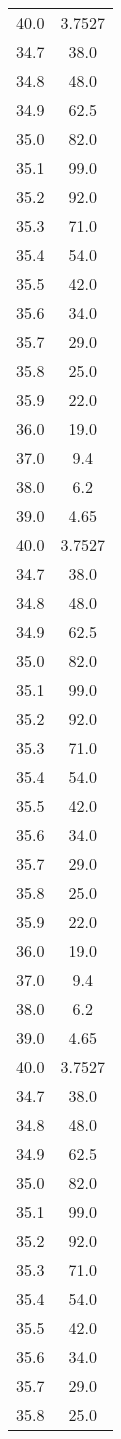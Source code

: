 \begin{table}
\begin{tabular}{S[]S[]}
40.0 & 3.7527\\
34.7 & 38.0\\
34.8 & 48.0\\
34.9 & 62.5\\
35.0 & 82.0\\
35.1 & 99.0\\
35.2 & 92.0\\
35.3 & 71.0\\
35.4 & 54.0\\
35.5 & 42.0\\
35.6 & 34.0\\
35.7 & 29.0\\
35.8 & 25.0\\
35.9 & 22.0\\
36.0 & 19.0\\
37.0 & 9.4\\
38.0 & 6.2\\
39.0 & 4.65\\
40.0 & 3.7527\\
34.7 & 38.0\\
34.8 & 48.0\\
34.9 & 62.5\\
35.0 & 82.0\\
35.1 & 99.0\\
35.2 & 92.0\\
35.3 & 71.0\\
35.4 & 54.0\\
35.5 & 42.0\\
35.6 & 34.0\\
35.7 & 29.0\\
35.8 & 25.0\\
35.9 & 22.0\\
36.0 & 19.0\\
37.0 & 9.4\\
38.0 & 6.2\\
39.0 & 4.65\\
40.0 & 3.7527\\
34.7 & 38.0\\
34.8 & 48.0\\
34.9 & 62.5\\
35.0 & 82.0\\
35.1 & 99.0\\
35.2 & 92.0\\
35.3 & 71.0\\
35.4 & 54.0\\
35.5 & 42.0\\
35.6 & 34.0\\
35.7 & 29.0\\
35.8 & 25.0\\

\end{tabular}
\end{table}
